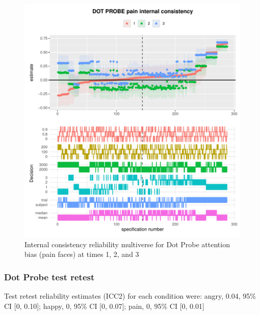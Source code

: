 \documentclass[
  man,floatsintext]{apa6}
\begin{document}
\begin{figure}
\centering
\includegraphics{Reliability_Multiverse_files/figure-latex/unnamed-chunk-15-1.pdf}
\caption{\label{fig:unnamed-chunk-15}Internal consistency reliability multiverse for Dot Probe attention bias (pain faces) at times 1, 2, and 3}
\end{figure}

\hypertarget{dot-probe-test-retest}{%
\subsubsection{Dot Probe test retest}\label{dot-probe-test-retest}}

Test retest reliability estimates (ICC2) for each condition were: angry, 0.04, 95\% CI {[}0, 0.10{]}; happy, 0, 95\% CI {[}0, 0.07{]}; pain, 0, 95\% CI {[}0, 0.01{]}
\end{document}
